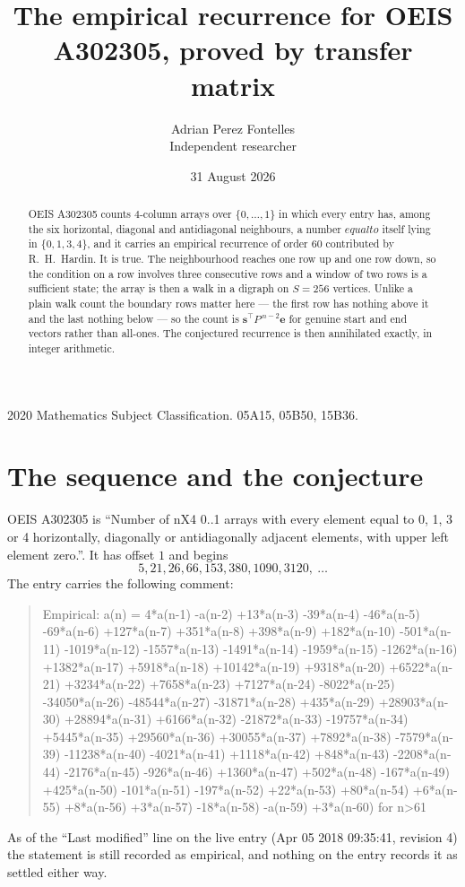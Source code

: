 \documentclass[11pt,a4paper]{article}
\title{The empirical recurrence for OEIS A302305, proved by transfer matrix}
\author{Adrian Perez Fontelles\\ \small Independent researcher}
\date{31 August 2026}
\theoremstyle{plain}
\theoremstyle{definition}
\begin{document}
\maketitle

\begin{abstract}
OEIS A302305 counts $4$-column arrays over $\{0,\dots,1\}$ in which every entry has,
among the six horizontal, diagonal and antidiagonal neighbours, a number $equal to$ itself lying in $\{0,1,3,4\}$, and it carries an empirical
recurrence of order $60$ contributed by R.~H.~Hardin. It is true. The neighbourhood
reaches one row up and one row down, so the condition on a row involves three consecutive
rows and a window of two rows is a sufficient state; the array is then a walk in a digraph
on $S=256$ vertices. Unlike a plain walk count the boundary rows matter here --- the first
row has nothing above it and the last nothing below --- so the count is
$\mathbf{s}^{\!\top}P^{\,n-2}\mathbf{e}$ for genuine start and end vectors rather than
all-ones. The conjectured recurrence is then annihilated exactly, in integer arithmetic.
\end{abstract}

\noindent\small 2020 Mathematics Subject Classification. 05A15, 05B50, 15B36.\normalsize

\section{The sequence and the conjecture}

OEIS A302305 is ``Number of nX4 0..1 arrays with every element equal to 0, 1, 3 or 4 horizontally, diagonally or antidiagonally adjacent elements, with upper left element zero.''. It has offset
$1$ and begins
\[
5, 21, 26, 66, 153, 380, 1090, 3120,\ \dots
\]
The entry carries the following comment:
\begin{quote}\small
Empirical: a(n) = 4*a(n-1) -a(n-2) +13*a(n-3) -39*a(n-4) -46*a(n-5) -69*a(n-6) +127*a(n-7) +351*a(n-8) +398*a(n-9) +182*a(n-10) -501*a(n-11) -1019*a(n-12) -1557*a(n-13) -1491*a(n-14) -1959*a(n-15) -1262*a(n-16) +1382*a(n-17) +5918*a(n-18) +10142*a(n-19) +9318*a(n-20) +6522*a(n-21) +3234*a(n-22) +7658*a(n-23) +7127*a(n-24) -8022*a(n-25) -34050*a(n-26) -48544*a(n-27) -31871*a(n-28) +435*a(n-29) +28903*a(n-30) +28894*a(n-31) +6166*a(n-32) -21872*a(n-33) -19757*a(n-34) +5445*a(n-35) +29560*a(n-36) +30055*a(n-37) +7892*a(n-38) -7579*a(n-39) -11238*a(n-40) -4021*a(n-41) +1118*a(n-42) +848*a(n-43) -2208*a(n-44) -2176*a(n-45) -926*a(n-46) +1360*a(n-47) +502*a(n-48) -167*a(n-49) +425*a(n-50) -101*a(n-51) -197*a(n-52) +22*a(n-53) +80*a(n-54) +6*a(n-55) +8*a(n-56) +3*a(n-57) -18*a(n-58) -a(n-59) +3*a(n-60) for n>61
\end{quote}
As of the ``Last modified'' line on the live entry (Apr 05 2018 09:35:41, revision
4) the statement is still recorded as empirical, and nothing on the entry
records it as settled either way.
\end{document}
